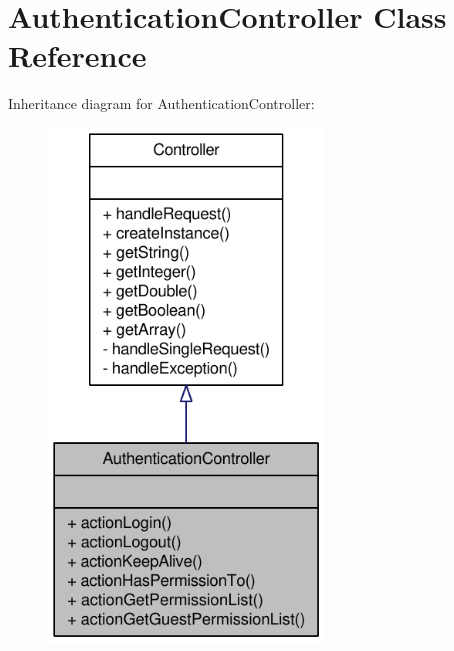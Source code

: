 \hypertarget{classAuthenticationController}{
\section{AuthenticationController Class Reference}
\label{classAuthenticationController}
}


Inheritance diagram for AuthenticationController:\nopagebreak
\begin{figure}[H]
\begin{center}
\leavevmode
\includegraphics[width=208pt]{classAuthenticationController__inherit__graph}
\end{center}
\end{figure}


